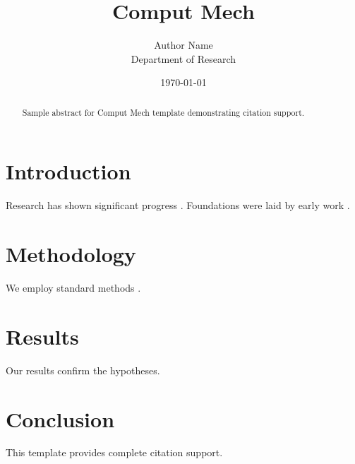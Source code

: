 \documentclass{llncs}
\title{Comput Mech}
\author{Author Name \\ \small Department of Research}
\date{\today}
\begin{document}
\maketitle

\begin{abstract}
Sample abstract for Comput Mech template demonstrating citation support.
\end{abstract}

\section{Introduction}
Research has shown significant progress \citep{einstein1905}. Foundations were laid by early work \citep{turing1950}.

\section{Methodology}
We employ standard methods \citep{knuth1984}.

\section{Results}
Our results confirm the hypotheses.

\section{Conclusion}
This template provides complete citation support.



\end{document}
